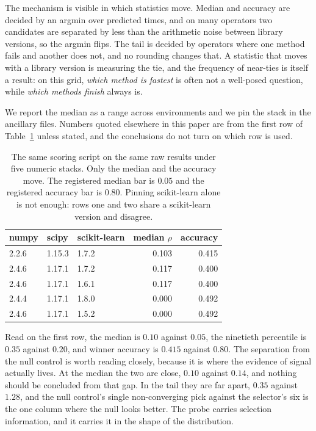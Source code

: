 \documentclass[11pt]{article}
\begin{document}
The mechanism is visible in which statistics move. Median and accuracy are decided by an
argmin over predicted times, and on many operators two candidates are separated by less
than the arithmetic noise between library versions, so the argmin flips. The tail is
decided by operators where one method fails and another does not, and no rounding changes
that. A statistic that moves with a library version is measuring the tie, and the frequency
of near-ties is itself a result: on this grid, \emph{which method is fastest} is often not
a well-posed question, while \emph{which methods finish} always is.

We report the median as a range across environments and we pin the stack in the ancillary
files. Numbers quoted elsewhere in this paper are from the first row of
Table~\ref{tab:env} unless stated, and the conclusions do not turn on which row is used.

\begin{table}[h]
\centering
\begin{tabular}{lllrr}
\toprule
numpy & scipy & scikit-learn & median $\rho$ & accuracy \\
\midrule
2.2.6 & 1.15.3 & 1.7.2 & 0.103 & 0.415 \\
2.4.6 & 1.17.1 & 1.7.2 & 0.117 & 0.400 \\
2.4.6 & 1.17.1 & 1.6.1 & 0.117 & 0.400 \\
2.4.4 & 1.17.1 & 1.8.0 & 0.000 & 0.492 \\
2.4.6 & 1.17.1 & 1.5.2 & 0.000 & 0.492 \\
\bottomrule
\end{tabular}
\caption{The same scoring script on the same raw results under five numeric stacks. Only
the median and the accuracy move. The registered median bar is $0.05$ and the registered
accuracy bar is $0.80$. Pinning scikit-learn alone is not enough: rows one and two share a
scikit-learn version and disagree.}
\label{tab:env}
\end{table}

Read on the first row, the median is $0.10$ against $0.05$, the
ninetieth percentile is $0.35$ against $0.20$, and winner accuracy is $0.415$
against $0.80$. The separation from the null control is worth reading closely,
because it is where the evidence of signal actually lives. At the median the two
are close, $0.10$ against $0.14$, and nothing should be concluded from that gap.
In the tail they are far apart, $0.35$ against $1.28$, and the null control's
single non-converging pick against the selector's six is the one column where the
null looks better. The probe carries selection information, and it carries it in
the shape of the distribution.
\end{document}
